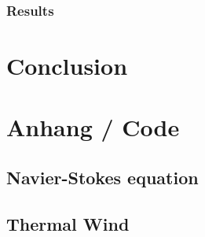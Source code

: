 \documentclass[12pt, a4paper, twoside]{article}
\begin{document}
		\subsubsection{Results}

	\newpage
\section{Conclusion}

	\newpage
\section{Anhang / Code}
	\subsection{Navier-Stokes equation}
	\subsection{Thermal Wind}
\pagebreak
\end{document}

